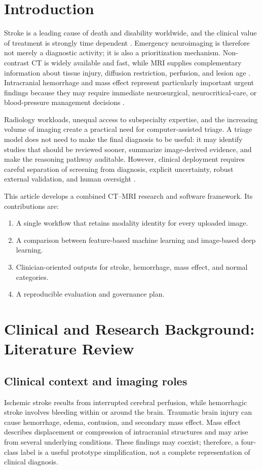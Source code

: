 \documentclass[10pt,a4paper]{article}
\begin{document}
\section{Introduction}
Stroke is a leading cause of death and disability worldwide, and the clinical value of treatment is strongly time dependent \citep{who2022,feigin2022,campbell2020}. Emergency neuroimaging is therefore not merely a diagnostic activity; it is also a prioritization mechanism. Non-contrast CT is widely available and fast, while MRI supplies complementary information about tissue injury, diffusion restriction, perfusion, and lesion age \citep{powers2019,wintermark2013,chalela2007}. Intracranial hemorrhage and mass effect represent particularly important urgent findings because they may require immediate neurosurgical, neurocritical-care, or blood-pressure management decisions \citep{greenberg2022,hemphill2001}.

Radiology workloads, unequal access to subspecialty expertise, and the increasing volume of imaging create a practical need for computer-assisted triage. A triage model does not need to make the final diagnosis to be useful: it may identify studies that should be reviewed sooner, summarize image-derived evidence, and make the reasoning pathway auditable. However, clinical deployment requires careful separation of screening from diagnosis, explicit uncertainty, robust external validation, and human oversight \citep{topol2019,kelly2019,holzinger2019}.

This article develops a combined CT--MRI research and software framework. Its contributions are:
\begin{enumerate}[leftmargin=*,nosep]
\item A single workflow that retains modality identity for every uploaded image.
\item A comparison between feature-based machine learning and image-based deep learning.
\item Clinician-oriented outputs for stroke, hemorrhage, mass effect, and normal categories.
\item A reproducible evaluation and governance plan.
\end{enumerate}

\section{Clinical and Research Background: Literature Review}
\subsection{Clinical context and imaging roles}
Ischemic stroke results from interrupted cerebral perfusion, while hemorrhagic stroke involves bleeding within or around the brain. Traumatic brain injury can cause hemorrhage, edema, contusion, and secondary mass effect. Mass effect describes displacement or compression of intracranial structures and may arise from several underlying conditions. These findings may coexist; therefore, a four-class label is a useful prototype simplification, not a complete representation of clinical diagnosis.
\end{document}
